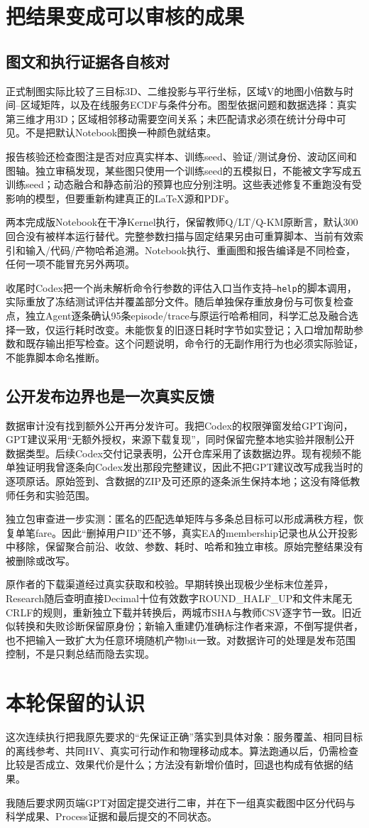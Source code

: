 \section{把结果变成可以审核的成果}
\subsection{图文和执行证据各自核对}
正式制图实际比较了三目标3D、二维投影与平行坐标，区域V的地图小倍数与时间--区域矩阵，以及在线服务ECDF与条件分布。图型依据问题和数据选择：真实第三维才用3D；区域相邻移动需要空间关系；未匹配请求必须在统计分母中可见。不是把默认Notebook图换一种颜色就结束。

报告核验还检查图注是否对应真实样本、训练seed、验证/测试身份、波动区间和图轴。独立审稿发现，某些图只使用一个训练seed的五模拟日，不能被文字写成五训练seed；动态融合和静态前沿的预算也应分别注明。这些表述修复不重跑没有受影响的模型，但要重新构建真正的LaTeX源和PDF。

两本完成版Notebook在干净Kernel执行，保留教师Q/LT/Q-KM原断言，默认300回合没有被样本运行替代。完整参数扫描与固定结果另由可重算脚本、当前有效索引和输入/代码/产物哈希追溯。Notebook执行、重画图和报告编译是不同检查，任何一项不能冒充另外两项。

收尾时Codex把一个尚未解析命令行参数的评估入口当作支持\texttt{--help}的脚本调用，实际重放了冻结测试评估并覆盖部分文件。随后单独保存重放身份与可恢复检查点，独立Agent逐条确认95条episode/trace与原运行哈希相同，科学汇总及融合选择一致，仅运行耗时改变。未能恢复的旧逐日耗时字节如实登记；入口增加帮助参数和既存输出拒写检查。这个问题说明，命令行的无副作用行为也必须实际验证，不能靠脚本命名推断。

\subsection{公开发布边界也是一次真实反馈}
数据审计没有找到额外公开再分发许可。我把Codex的权限弹窗发给GPT询问，GPT建议采用“无额外授权，来源下载复现”，同时保留完整本地实验并限制公开数据类型。后续Codex交付记录表明，公开仓库采用了该数据边界。现有视频不能单独证明我曾逐条向Codex发出那段完整建议，因此不把GPT建议改写成我当时的逐项原话。原始签到、含数据的ZIP及可还原的逐条派生保持本地；这没有降低教师任务和实验范围。

独立包审查进一步实测：匿名的匹配选单矩阵与多条总目标可以形成满秩方程，恢复单笔fare。因此“删掉用户ID”还不够，真实EA的membership记录也从公开投影中移除，保留聚合前沿、收敛、参数、耗时、哈希和独立审核。原始完整结果没有被删除或改写。

原作者的下载渠道经过真实获取和校验。早期转换出现极少坐标末位差异，Research随后查明直接Decimal十位有效数字ROUND\_HALF\_UP和文件末尾无CRLF的规则，重新独立下载并转换后，两城市SHA与教师CSV逐字节一致。旧近似转换和失败诊断保留原身份；新输入重建仍准确标注作者来源，不倒写提供者，也不把输入一致扩大为任意环境随机产物bit一致。对数据许可的处理是发布范围控制，不是只剩总结而隐去实现。

\section{本轮保留的认识}
这次连续执行把我原先要求的“先保证正确”落实到具体对象：服务覆盖、相同目标的离线参考、共同HV、真实可行动作和物理移动成本。算法跑通以后，仍需检查比较是否成立、效果代价是什么；方法没有新增价值时，回退也构成有依据的结果。

我随后要求网页端GPT对固定提交进行二审，并在下一组真实截图中区分代码与科学成果、Process证据和最后提交的不同状态。
